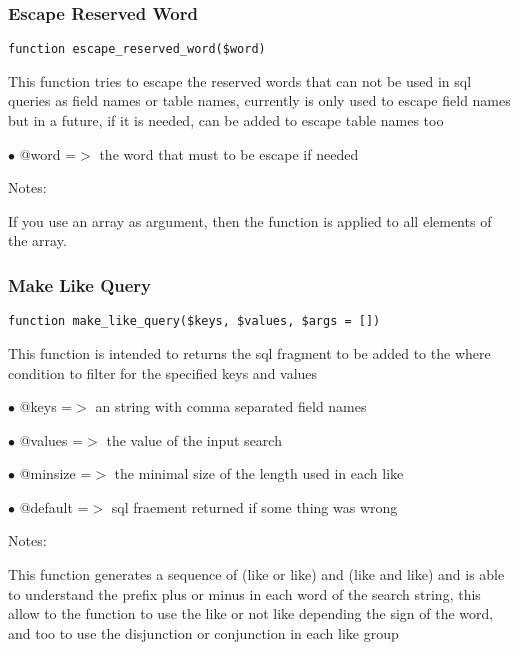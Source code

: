 \documentclass[a4paper]{article}
\begin{document}
\hypertarget{toc229}{}
\subsubsection{Escape Reserved Word}

\begin{lstlisting}
function escape_reserved_word($word)
\end{lstlisting}

This function tries to escape the reserved words that can not be used
in sql queries as field names or table names, currently is only used
to escape field names but in a future, if it is needed, can be added
to escape table names too

\begin{compactitem}
\item[\color{myblue}$\bullet$] @word =$>$ the word that must to be escape if needed
\end{compactitem}

Notes:

If you use an array as argument, then the function is applied to all
elements of the array.

\hypertarget{toc230}{}
\subsubsection{Make Like Query}

\begin{lstlisting}
function make_like_query($keys, $values, $args = [])
\end{lstlisting}

This function is intended to returns the sql fragment to be added to
the where condition to filter for the specified keys and values

\begin{compactitem}
\item[\color{myblue}$\bullet$] @keys    =$>$ an string with comma separated field names
\item[\color{myblue}$\bullet$] @values  =$>$ the value of the input search
\item[\color{myblue}$\bullet$] @minsize =$>$ the minimal size of the length used in each like
\item[\color{myblue}$\bullet$] @default =$>$ sql fraement returned if some thing was wrong
\end{compactitem}

Notes:

This function generates a sequence of (like or like) and (like and like)
and is able to understand the prefix plus or minus in each word of the
search string, this allow to the function to use the like or not like
depending the sign of the word, and too to use the disjunction or
conjunction in each like group
\end{document}
